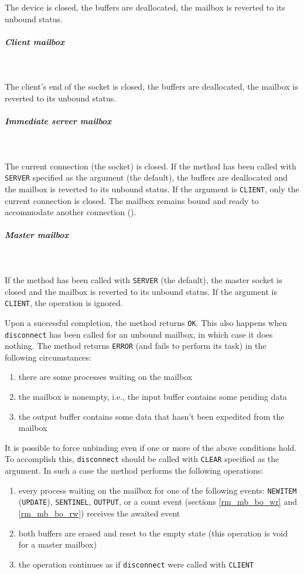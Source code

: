 \noindent
The device is closed, the buffers are deallocated, the mailbox is reverted
to its unbound status.

\subparagraph*{Client mailbox}\mbox{~}\vspace{0.1in}

\noindent
The client's end of the socket is closed, the buffers are deallocated,
the mailbox is reverted to its unbound status.

\subparagraph*{Immediate server mailbox}\mbox{~}\vspace{0.1in}

\noindent
The current connection (the socket) is closed.
If the method has been called with {\tt SERVER} specified as the argument
(the default),
the buffers are deallocated and the mailbox is reverted to its unbound
status.
If the argument is {\tt CLIENT}, only the current connection is closed.
The mailbox remains bound and ready
to accommodate another connection ().

\subparagraph*{Master mailbox}\mbox{~}\vspace{0.1in}

\noindent
If the method has been called with {\tt SERVER} (the default),
the master socket is closed and the mailbox is reverted to its
unbound status.
If the argument is {\tt CLIENT}, the operation is ignored.

\medskip

\noindent
Upon a successful completion, the method returns {\tt OK}.
This also happens when {\tt disconnect} has been
called for an unbound mailbox, in which case it does nothing.
The method returns {\tt ERROR} (and fails to perform its task) in the
following circumstances:

\begin{enumerate}
\item
there are some processes waiting on the mailbox
\item
the mailbox is nonempty, i.e., the input buffer contains some pending data
\item
the output buffer contains some data that hasn't been expedited from the
mailbox
\end{enumerate}

It is possible to force unbinding even if one or more of the above
conditions hold.
To accomplish this, {\tt disconnect} should be called with {\tt CLEAR}
specified as the argument.
In such a case the method performs the following operations:

\begin{enumerate}
\item
every process waiting on the mailbox for one of the following
events: {\tt NEWITEM} ({\tt UPDATE}), {\tt SENTINEL}, {\tt OUTPUT},
or a count event (sections \ref{rm_mb_bo_wr} and \ref{rm_mb_bo_rw}) receives the
awaited event
\item
both buffers are erased and reset to the empty state (this operation
is void for a master mailbox)
\item
the operation continues as if {\tt disconnect} were called with
{\tt CLIENT}
\end{enumerate}

